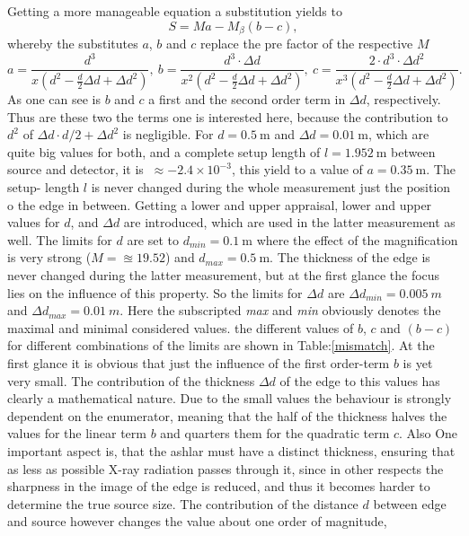 Getting a more manageable equation a substitution yields to 
\begin{equation}
S = M a- M_{\beta} (b-c),
\end{equation}
whereby the substitutes $a$, $b$ and $c$ replace the pre factor of the respective $M$  
\begin{equation}
a = \frac{d^{3}}{x(d^{2}-\frac{d}{2} \Delta d + \Delta d^{2})}, \ 
b = \frac{d^{3} \cdot \Delta d}{x^{2}(d^{2}-\frac{d}{2} \Delta d + \Delta d^{2})}, \
c = \frac{2 \cdot d^{3} \cdot \Delta d^{2}}{x^{3}(d^{2}-\frac{d}{2} \Delta d + \Delta d^{2})}. 
\end{equation} 
As one can see is $b$ and $c$ a first and the second order term in $\Delta d$, respectively. Thus are these two the terms one is interested here, because the contribution to $d^{2}$ of $\Delta d \cdot d/2 + \Delta d^{2}$ is negligible. For $d = 0.5\ $m and $\Delta d = 0.01\ $m, which are quite big values for both, and a complete setup length of $l = 1.952\ $m between source and detector, it is $\ \approx -2.4\times 10^{-3}$, this yield to a value of $a = 0.35\ $m. The setup- length $l$ is never changed during the whole measurement just the position o the edge in between. Getting a lower and upper appraisal, lower and upper values for $d$, and $\Delta d$ are introduced, which are used in the latter measurement as well. The limits for $d$ are set to $d_{min} = 0.1\ $m where the effect of the magnification is very strong ($M = \approxeq 19.52$) and $d_{max} = 0.5\ $m. The thickness of the edge is never changed during the latter measurement, but at the first glance the focus lies on the influence of this property. So the limits for $\Delta d$ are $\Delta d_{min} = 0.005\ m$ and $\Delta d_{max} = 0.01\ m$. Here the subscripted \textit{max} and \textit{min} obviously denotes the maximal and minimal considered values. the different values of $b$, $c$ and $(b-c)$ for different combinations of the limits are shown in Table:\ref{mismatch}. At the first glance it is obvious that just the influence of the first order-term $b$ is yet very small. The contribution of the thickness $\Delta d$ of the edge to this values has clearly a mathematical nature. Due to the small values the behaviour is strongly dependent on the enumerator, meaning that the half of the thickness halves the values for the linear term $b$ and quarters them for the quadratic term $c$. Also One important aspect is, that the ashlar must have a distinct thickness, ensuring that as less as possible X-ray radiation passes through it, since in other respects the sharpness in the image of the edge is reduced, and thus it becomes harder to determine the true source size. The contribution of the distance $d$ between edge and source however changes the value about one order of magnitude,
